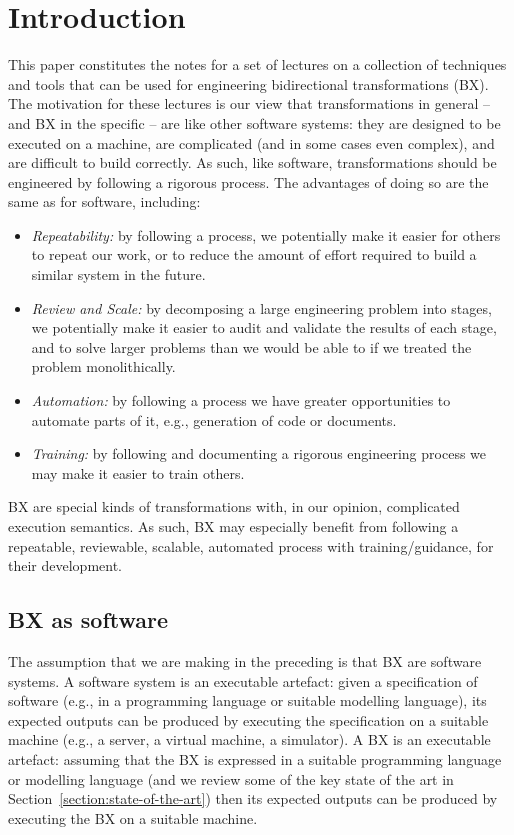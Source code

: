 \section{Introduction}
\label{section:introduction}

This paper constitutes the notes for a set of lectures on a collection of techniques and tools that can be used for engineering bidirectional transformations (BX). The motivation for these lectures is our view that transformations in general -- and BX in the specific -- are like other software systems: they are designed to be executed on a machine, are complicated (and in some cases even complex), and are difficult to build correctly. As such, like software, transformations should be engineered by following a rigorous process. The advantages of doing so are the same as for software, including:
\begin{itemize}
\item \textit{Repeatability:} by following a process, we potentially make it easier for others to repeat our work, or to reduce the amount of effort required to build a similar system in the future.
\item \textit{Review and Scale:} by decomposing a large engineering problem into stages, we potentially make it easier to audit and validate the results of each stage, and to solve larger problems than we would be able to if we treated the problem monolithically.
\item \textit{Automation:} by following a process we have greater opportunities to automate parts of it, e.g., generation of code or documents. 
\item \textit{Training:} by following and documenting a rigorous engineering process we may make it easier to train others.
\end{itemize}
BX are special kinds of transformations with, in our opinion, complicated execution semantics. As such, BX may especially benefit from following a repeatable, reviewable, scalable, automated process with training/guidance, for their development.

\subsection{BX as software}
The assumption that we are making in the preceding is that BX are software systems. A software system is an executable artefact: given a specification of software (e.g., in a programming language or suitable modelling language), its expected outputs can be produced by executing the specification on a suitable machine (e.g., a server, a virtual machine, a simulator). A BX is an executable artefact: assuming that the BX is expressed in a suitable programming language or modelling language (and we review some of the key state of the art in Section~\ref{section:state-of-the-art}) then its expected outputs can be produced by executing the BX on a suitable machine. 

